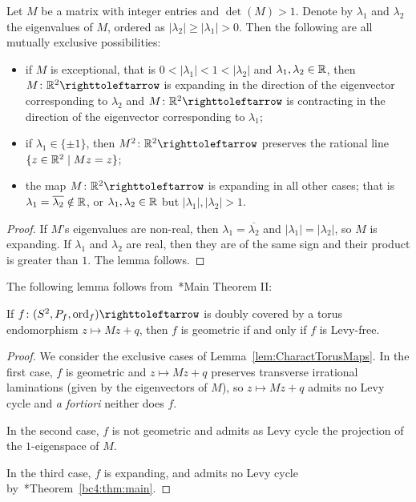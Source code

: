 \documentclass{amsart}
\begin{document}
\begin{lem}\label{lem:CharactTorusMaps}
  Let $M$ be a matrix with integer entries and $\det(M)>1$. Denote by
  $\lambda_1$ and $\lambda_2$ the eigenvalues of $M$, ordered as
  $|\lambda_2|\ge |\lambda_1|>0$. Then the following are all mutually
  exclusive possibilities:
  \begin{itemize}
  \item if $M$ is exceptional, that is $0<|\lambda_1|<1<|\lambda_2|$
    and $\lambda_1,\lambda_2\in {\mathbb R}$, then $M\colon\R^2\selfmap$ is
    expanding in the direction of the eigenvector corresponding to
    $\lambda_2$ and $M\colon\R^2\selfmap$ is contracting in the
    direction of the eigenvector corresponding to $\lambda_1$;
  \item if $\lambda_1\in \{\pm 1\}$, then $M^2\colon\R^2\selfmap$
    preserves the rational line $\{z\in {\mathbb R}^2\mid M z=z\}$;
  \item the map $M\colon\R^2\selfmap$ is expanding in all other cases;
    that is $\lambda_1=\overline {\lambda_2}\notin{\mathbb R}$, or
    $\lambda_1,\lambda_2\in {\mathbb R}$ but $|\lambda_1|,|\lambda_2| > 1$.
  \end{itemize}
\end{lem}
\begin{proof}
  If $M$'s eigenvalues are non-real, then
  $\lambda_1=\overline{\lambda_2}$ and $|\lambda_1|=|\lambda_2|$, so
  $M$ is expanding. If $\lambda_1$ and $\lambda_2$ are real, then they
  are of the same sign and their product is greater than $1$. The
  lemma follows.
\end{proof}

\noindent The following lemma follows from~\cite{selinger-yampolsky:geometrization}*{Main Theorem II}:
\begin{lem}\label{lem:Tor:geom=lf}
  If $f\colon(S^2,P_f,\ord_f)\selfmap$ is doubly covered by a torus
  endomorphism $z\mapsto M z+q$, then $f$ is geometric if and only if
  $f$ is Levy-free.
\end{lem}
\begin{proof}
  We consider the exclusive cases of
  Lemma~\ref{lem:CharactTorusMaps}. In the first case, $f$ is
  geometric and $z\mapsto M z+q$ preserves transverse irrational
  laminations (given by the eigenvectors of $M$), so $z\mapsto M z+q$
  admits no Levy cycle and \emph{a fortiori} neither does $f$.

  In the second case, $f$ is not geometric and admits as Levy cycle
  the projection of the $1$-eigenspace of $M$.

  In the third case, $f$ is expanding, and admits no Levy cycle
  by~\cite{bartholdi-dudko:bc4}*{Theorem~\ref{bc4:thm:main}}.
\end{proof}
\end{document}
